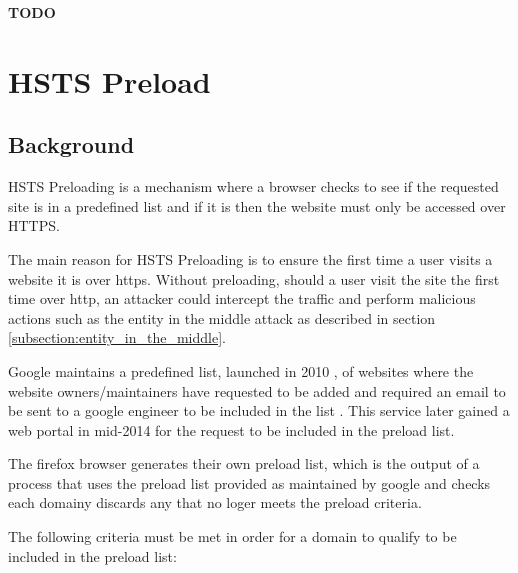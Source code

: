 \documentclass{mscreport}
\begin{document}
\textbf{TODO}

\clearpage
\newpage


\section{HSTS Preload}
\label{section:hsts_preload}

\subsection{Background}

HSTS Preloading is a mechanism where a browser checks to see if the requested site is in a predefined list and if it is then the website must only be accessed over HTTPS.

\vspace{0.3cm} \noindent
The main reason for HSTS Preloading is to ensure the first time a user visits a website it is over https. Without preloading, should a user visit the site the first time over http, an attacker could intercept the traffic and perform malicious actions such as the entity in the middle attack as described in section \ref{subsection:entity_in_the_middle}.

\vspace{0.3cm} \noindent
Google maintains a predefined list, launched in 2010 \cite{Michael2015-hn}, of websites where the website owners/maintainers have requested to be added and required an email to be sent to a google  engineer to be included in the list \cite{Langley_undated-dm}. This service later gained a web portal in mid-2014 \cite{Michael2015-hn} for the request to be included in the preload list.

\vspace{0.3cm} \noindent
The firefox browser generates their own preload list, which is the output of a process that uses the preload list provided as maintained by google and checks each domainy discards any that no loger meets the preload criteria.

\vspace{0.3cm} \noindent
The following criteria must be met in order for a domain to qualify to be included in the preload list:
\end{document}
